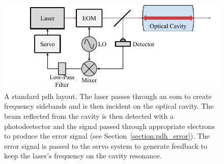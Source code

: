 \begin{figure}
\centering
\includegraphics{part1/Figs/PDH.pdf}
\caption{A standard \gls{pdh} layout.
The laser passes through an \gls{eom} to create frequency sidebands and is then incident on the optical cavity.
The beam reflected from the cavity is then detected with a photodeetector and the signal passed through appropriate electrons to produce the error signal (see Section~\ref{section:pdh_error}).
The error signal is passed to the servo system to generate feedback to keep the laser's frequency on the cavity resonance.}
\label{figure:pdh_schematic}
\end{figure}



